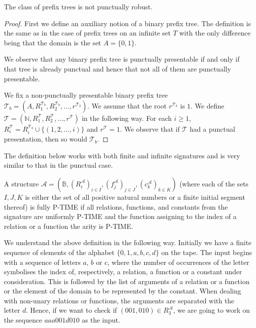 \documentclass[a4paper,UKenglish,cleveref, autoref, thm-restate]{lipics-v2021}
\begin{document}
\begin{theorem}
    The class of prefix trees is not punctually robust.
\end{theorem}

\begin{proof}
  First we define an auxiliary notion of a binary prefix tree. The definition is the same as in the case of prefix trees on an infinite set $T$ with the only difference being that the domain is the set $A=\{0,1\}$.
  
  We observe that any binary prefix tree is punctually presentable if and only if that tree is already punctual and hence that not all of them are punctually presentable.

  We fix a non-punctually presentable binary prefix tree $\mathcal{T}_b= (A,R_1^{\mathcal{T}_b},R_2^{\mathcal{T}_b},\dots, r^{\mathcal{T}_b} )$. We assume that the root $r^{\mathcal{T}_b}$ is $1$. We define $\mathcal{T}=(\mathbb{N},R_1^{\mathcal{T}},R_2^{\mathcal{T}},\dots,r^{\mathcal{T}})$ in the following way. For each $i\geq 1$, $R_i^{\mathcal{T}}=R_i^{\mathcal{T}_b} \cup \{(1,2,\dots, i)\}$ and $r^{\mathcal{T}}=1$. We observe that if $\mathcal{T}$ had a punctual presentation, then so would $\mathcal{T}_b$. 
\end{proof}

The definition below works with both finite and infinite signatures and is very similar to that in the punctual case.

\begin{definition}
    A structure $\mathcal{A}=(\mathbb{B},(R_i^{\mathcal{A}})_{i \in I},(f_j^{\mathcal{A}})_{j \in J},(c_k^{\mathcal{A}})_{k \in K})$ (where each of the sets $I,J,K$ is either the set of all positive natural numbers or a finite initial segment thereof) is fully P-TIME if all relations, functions, and constants from the signature are uniformly P-TIME and the function assigning to the index of a relation or a function the arity is P-TIME.
\end{definition}

We understand the above definition in the following way. Initially we have a finite sequence of elements of the alphabet $\{0,1,a,b,c,d\}$ on the tape. The input begins with a sequence of letters $a$, $b$ or $c$, where the number of occurrences of the letter symbolises the index of, respectively, a relation, a function or a constant under consideration. This is followed by the list of arguments of a relation or a function or the element of the domain to be represented by the constant. When dealing with non-unary relations or functions, the arguments are separated with the letter $d$. Hence, if we want to check if $(001,010) \in R_3^{\mathcal{A}}$, we are going to work on the sequence $aaa001d010$ as the input.
\end{document}
